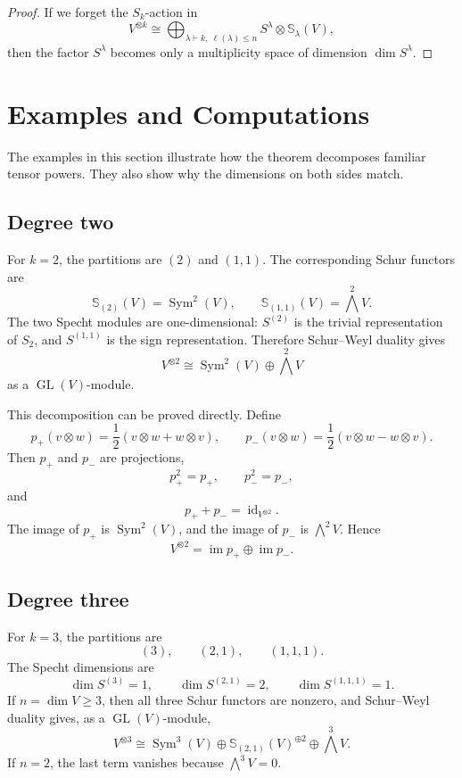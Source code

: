 \documentclass[12pt,a4paper]{article}
\theoremstyle{definition}
\theoremstyle{remark}
\newcommand{\GL}{\operatorname{GL}}
\newcommand{\Sym}{\operatorname{Sym}}
\newcommand{\id}{\operatorname{id}}
\newcommand{\Schur}[1]{\mathbb{S}_{#1}}
\begin{document}
\begin{proof}
If we forget the \(S_k\)-action in
\[
V^{\otimes k}
  \cong
  \bigoplus_{\lambda\vdash k,\ \ell(\lambda)\le n}
  S^\lambda\otimes \Schur{\lambda}(V),
\]
then the factor \(S^\lambda\) becomes only a multiplicity space of dimension
\(\dim S^\lambda\).
\end{proof}

\section{Examples and Computations}

The examples in this section illustrate how the theorem decomposes familiar
tensor powers.  They also show why the dimensions on both sides match.

\subsection{Degree two}

For \(k=2\), the partitions are \((2)\) and \((1,1)\).  The corresponding
Schur functors are
\[
\Schur{(2)}(V)=\Sym^2(V),
\qquad
\Schur{(1,1)}(V)=\bigwedge^2V.
\]
The two Specht modules are one-dimensional: \(S^{(2)}\) is the trivial
representation of \(S_2\), and \(S^{(1,1)}\) is the sign representation.
Therefore Schur--Weyl duality gives
\[
V^{\otimes 2}\cong \Sym^2(V)\oplus \bigwedge^2V
\]
as a \(\GL(V)\)-module.

This decomposition can be proved directly.  Define
\[
p_+(v\otimes w)=\frac{1}{2}(v\otimes w+w\otimes v),
\qquad
p_-(v\otimes w)=\frac{1}{2}(v\otimes w-w\otimes v).
\]
Then \(p_+\) and \(p_-\) are projections,
\[
p_+^2=p_+,\qquad p_-^2=p_-,
\]
and
\[
p_++p_-=\id_{V^{\otimes 2}}.
\]
The image of \(p_+\) is \(\Sym^2(V)\), and the image of \(p_-\) is
\(\bigwedge^2V\).  Hence
\[
V^{\otimes 2}=\operatorname{im}p_+\oplus \operatorname{im}p_-.
\]

\subsection{Degree three}

For \(k=3\), the partitions are
\[
(3),\qquad (2,1),\qquad (1,1,1).
\]
The Specht dimensions are
\[
\dim S^{(3)}=1,\qquad
\dim S^{(2,1)}=2,\qquad
\dim S^{(1,1,1)}=1.
\]
If \(n=\dim V\ge 3\), then all three Schur functors are nonzero, and
Schur--Weyl duality gives, as a \(\GL(V)\)-module,
\[
V^{\otimes 3}
  \cong
  \Sym^3(V)\oplus
  \Schur{(2,1)}(V)^{\oplus 2}
  \oplus
  \bigwedge^3V.
\]
If \(n=2\), the last term vanishes because \(\bigwedge^3V=0\).
\end{document}
